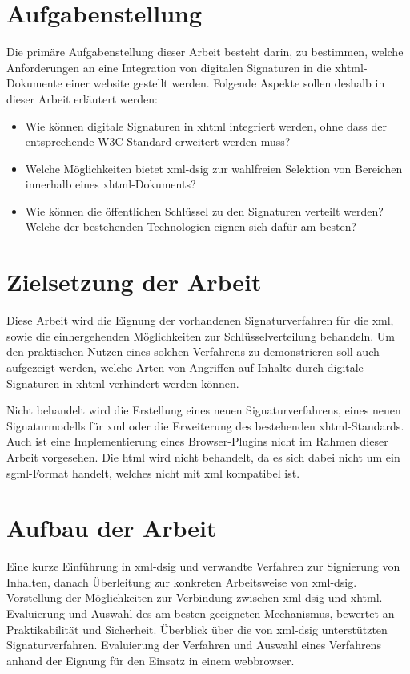 \section{Aufgabenstellung}
\label{sec:Einleitung:aufgabenstellung}
Die primäre Aufgabenstellung dieser Arbeit besteht darin, zu bestimmen, welche Anforderungen an eine Integration von digitalen Signaturen in die
\gls{xhtml}-Dokumente einer \gls{website} gestellt werden. Folgende Aspekte sollen deshalb in dieser Arbeit erläutert werden:
\begin{itemize}
    \item Wie können digitale Signaturen in \gls{xhtml} integriert werden, ohne dass der entsprechende W3C-Standard \cite{xhtml:w3c} erweitert werden muss?
    \item Welche Möglichkeiten bietet \gls{xml-dsig} \cite{xml-dsig:w3c} zur wahlfreien Selektion von Bereichen innerhalb eines \gls{xhtml}-Dokuments?
    \item Wie können die öffentlichen Schlüssel zu den Signaturen verteilt werden? Welche der bestehenden Technologien eignen sich dafür am besten?
\end{itemize}

\section{Zielsetzung der Arbeit}
\label{sec:Einleitung:ziele}
Diese Arbeit wird die Eignung der vorhandenen Signaturverfahren für die \gls{xml}, sowie die einhergehenden Möglichkeiten zur Schlüsselverteilung
behandeln. Um den praktischen Nutzen eines solchen Verfahrens zu demonstrieren soll auch aufgezeigt werden, welche Arten von Angriffen auf Inhalte durch
digitale Signaturen in \gls{xhtml} verhindert werden können.

Nicht behandelt wird die Erstellung eines neuen Signaturverfahrens, eines neuen Signaturmodells für \gls{xml} oder die Erweiterung des bestehenden
\gls{xhtml}-Standards. Auch ist eine Implementierung eines Browser-Plugins nicht im Rahmen dieser Arbeit vorgesehen. Die \gls{html} wird nicht behandelt, da es
sich dabei nicht um ein \gls{sgml}-Format handelt, welches nicht mit \gls{xml} kompatibel ist.


\section{Aufbau der Arbeit}
\label{sec:Einleitung:aufbau}
Eine kurze Einführung in \gls{xml-dsig} und verwandte Verfahren zur Signierung von Inhalten, danach Überleitung zur konkreten Arbeitsweise von \gls{xml-dsig}.
Vorstellung der Möglichkeiten zur Verbindung zwischen \gls{xml-dsig} und \gls{xhtml}. Evaluierung und Auswahl des am besten geeigneten Mechanismus, bewertet an
Praktikabilität und Sicherheit. Überblick über die von \gls{xml-dsig} unterstützten Signaturverfahren. Evaluierung der Verfahren und Auswahl eines Verfahrens
anhand der Eignung für den Einsatz in einem \gls{webbrowser}.

